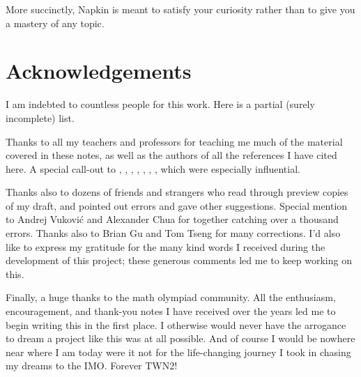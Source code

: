 More succinctly, Napkin is meant to satisfy your curiosity
rather than to give you a mastery of any topic.

\section*{Acknowledgements}
I am indebted to countless people for this work.
Here is a partial (surely incomplete) list.

Thanks to all my teachers and professors for teaching me much of the
material covered in these notes,
as well as the authors of all the references I have cited here.
A special call-out to \cite{ref:55a}, \cite{ref:msci},
\cite{ref:manifolds}, \cite{ref:gathmann}, \cite{ref:18-435},
\cite{ref:etingof}, \cite{ref:145a}, which were especially influential.

Thanks also to dozens of friends and strangers
who read through preview copies of my draft,
and pointed out errors and gave other suggestions.
Special mention to Andrej Vukovi\'c and Alexander Chua
for together catching over a thousand errors.
Thanks also to Brian Gu and Tom Tseng for many corrections.
I'd also like to express my gratitude for the many kind words I received
during the development of this project;
these generous comments led me to keep working on this.

Finally, a huge thanks to the math olympiad community.
All the enthusiasm, encouragement, and thank-you notes I have received
over the years led me to begin writing this in the first place.
I otherwise would never have the arrogance to dream a project like this
was at all possible.
And of course I would be nowhere near where I am today were it not for the
life-changing journey I took in chasing my dreams to the IMO.
Forever TWN2!
